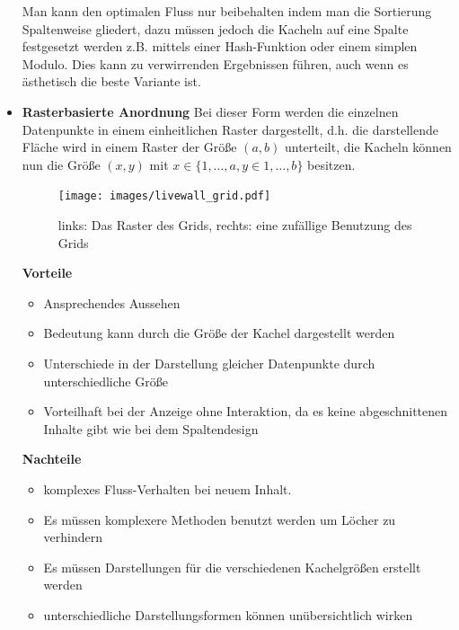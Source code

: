 \documentclass[12pt,twoside]{book}
\begin{document}
\begin{itemize}
Man kann den optimalen Fluss nur beibehalten indem man die Sortierung Spaltenweise gliedert, dazu müssen jedoch die Kacheln auf eine Spalte festgesetzt werden z.B. mittels einer Hash-Funktion oder einem simplen Modulo. Dies kann zu verwirrenden Ergebnissen führen, auch wenn es ästhetisch die beste Variante ist.

  \item \textbf{Rasterbasierte Anordnung}
  Bei dieser Form werden die einzelnen Datenpunkte in einem einheitlichen Raster dargestellt, d.h. die darstellende Fläche wird in einem Raster der Größe $(a, b)$ unterteilt, die Kacheln können nun die Größe $(x, y)$ mit $ x \in \{1, \dots, a, y \in 1, \dots, b\}$ besitzen.

  \begin{figure}[h]
    \centering
    \texttt{[image: images/livewall\_grid.pdf]}
    \caption{links: Das Raster des Grids, rechts: eine zufällige Benutzung des Grids}
    \label{fig:awesome_image}
  \end{figure}

  \textbf{Vorteile} \\
  \begin{itemize}
    \item Ansprechendes Aussehen
    \item Bedeutung kann durch die Größe der Kachel dargestellt werden
    \item Unterschiede in der Darstellung gleicher Datenpunkte durch unterschiedliche Größe
    \item Vorteilhaft bei der Anzeige ohne Interaktion, da es keine abgeschnittenen Inhalte gibt wie bei dem Spaltendesign
  \end{itemize}

  \textbf{Nachteile}\\
  \begin{itemize}
    \item komplexes Fluss-Verhalten bei neuem Inhalt.
    \item Es müssen komplexere Methoden benutzt werden um Löcher zu verhindern
    \item Es müssen Darstellungen für die verschiedenen Kachelgrößen erstellt werden
    \item unterschiedliche Darstellungsformen können unübersichtlich wirken
  \end{itemize}


\end{itemize}
\end{document}
